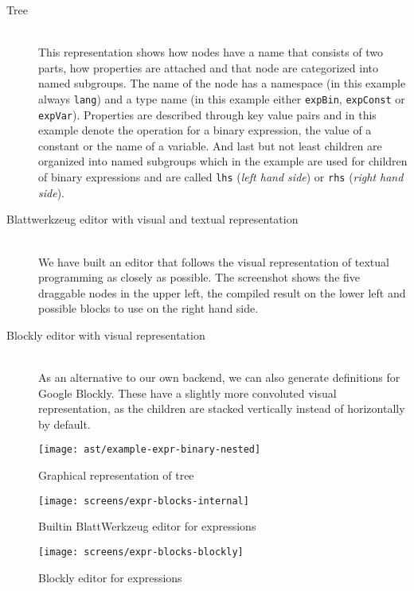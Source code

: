\documentclass[runningheads]{llncs}
\begin{document}
\begin{description}
\item[Tree] \hfill \\ This representation shows how nodes have a name that consists of two parts, how properties are attached and that node are categorized into named subgroups. The name of the node has a namespace (in this example always \texttt{lang}) and a type name (in this example either \texttt{expBin}, \texttt{expConst} or \texttt{expVar}). Properties are described through key value pairs and in this example denote the operation for a binary expression, the value of a constant or the name of a variable. And last but not least children are organized into named subgroups which in the example are used for children of binary expressions and are called \texttt{lhs} (\textit{left hand side}) or \texttt{rhs} (\textit{right hand side}).

  \item[Blattwerkzeug editor with visual and textual representation] \hfill \\ We have built an editor that follows the visual representation of textual programming as closely as possible. The screenshot shows the five draggable nodes in the upper left, the compiled result on the lower left and possible blocks to use on the right hand side.
  \item[Blockly editor with visual representation] \hfill \\ As an alternative to our own backend, we can also generate definitions for Google Blockly. These have a slightly more convoluted visual representation, as the children are stacked vertically instead of horizontally by default.
\end{description}

\begin{figure}[p]
  \texttt{[image: ast/example-expr-binary-nested]}
  \caption{Graphical representation of tree}
  \label{fig:ast-expr-binary}
\end{figure}

\begin{figure}[p]
  \texttt{[image: screens/expr-blocks-internal]}
  \caption{Builtin BlattWerkzeug editor for expressions}
  \label{fig:screen-editor-expr-internal}
\end{figure}

\begin{figure}[p]
  \texttt{[image: screens/expr-blocks-blockly]}
  \caption{Blockly editor for expressions}
  \label{fig:screen-editor-expr-blockly}
\end{figure}
\end{document}
